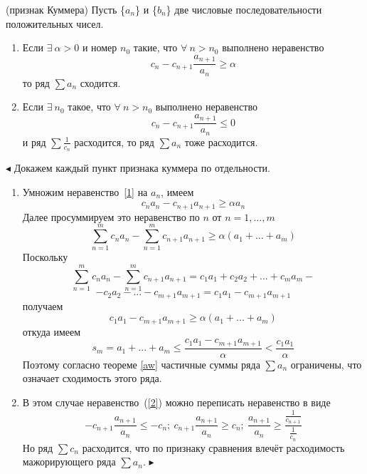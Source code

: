 \begin{theorem}(признак Куммера)
Пусть \{$a_n$\} и \{$b_n$\} две числовые последовательности положительных чисел.
\begin{enumerate}
\item Если $\exists\ \alpha>0$ и номер $n_0$ такие, что $\forall\ n>n_0$ выполнено неравенство
\begin{equation}
\label{1}
c_n-c_{n+1}\frac{a_{n+1}}{a_n}\ge\alpha
\end{equation}
то ряд $\sum{a_n}$ сходится.
\item Если $\exists\ n_0$ такое, что $\forall\ n>n_0$ выполнено неравенство
\begin{equation}
\label{2}
c_n-c_{n+1}\frac{a_{n+1}}{a_n}\le0
\end{equation}
и ряд $\sum{\frac{1}{c_n}}$ расходится, то ряд $\sum{a_n}$ тоже расходится.
\end{enumerate}
\end{theorem}
$\blacktriangleleft$ Докажем каждый пункт признака куммера по отдельности.
\begin{enumerate}
\item Умножим неравенство~\ref{1} на $a_n$, имеем
$${c_n}{a_n}-{c_{n+1}}{a_{n+1}}\ge\alpha{a_n}$$
Далее просуммируем это неравенство по $n$ от $n=1,...,m$
$$\sum_{n=1}^m{c_n{a_n}}-\sum_{n=1}^m{c_{n+1}{a_{n+1}}}\ge\alpha\left(a_1+...+a_m\right)$$
Поскольку
$$\sum_{n=1}^m{c_n{a_n}}-\sum_{n=1}^m{c_{n+1}{a_{n+1}}}={c_1}{a_1}+c_2{a_2}+...+c_m{a_m}-$$ $$-c_2{a_2}-...-c_{m+1}a_{m+1}=c_1{a_1}-c_{m+1}a_{m+1}$$
получаем
$$c_1{a_1}-c_{m+1}a_{m+1}\ge\alpha\left(a_1+...+a_m\right)$$
откуда имеем
$$s_m=a_1+...+a_m\le\frac{c_1{a_1}-c_{m+1}a_{m+1}}{\alpha}<\frac{c_1{a_1}}{\alpha}$$
Поэтому согласно теореме \ref{aw} частичные суммы ряда $\sum{a_n}$ ограничены, что означает сходимость этого ряда.
\item В этом случае неравенство~(\ref{2}) можно переписать неравенство в виде
$$-c_{n+1}\frac{a_{n+1}}{a_n}\le-c_n;\ c_{n+1}\frac{a_{n+1}}{a_n}\ge c_n;\ \frac{a_{n+1}}{a_n}\ge\frac{\frac{1}{c_{n+1}}}{\frac{1}{c_n}}$$
Но ряд $\sum{c_n}$ расходится, что по признаку сравнения влечёт расходимость мажорирующего ряда $\sum{a_n}$. $\blacktriangleright$
\end{enumerate}


